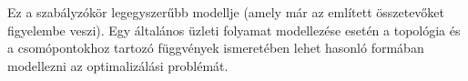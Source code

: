 \documentclass[a4paper]{article}
\begin{document}
Ez a szabályzókör legegyszerűbb modellje (amely már az említett összetevőket figyelembe veszi).
Egy általános üzleti folyamat modellezése esetén a topológia és a csomópontokhoz tartozó függvények ismeretében lehet hasonló formában modellezni az optimalizálási problémát.



\end{document}
